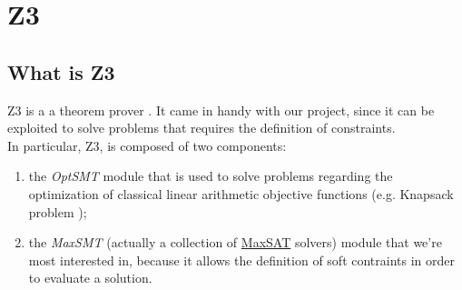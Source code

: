 \chapter{Z3}\label{Z3}
\section{What is Z3}
Z3 is a a theorem prover \cite{z3}. It came in handy with our project, since it can be exploited to solve problems that requires the definition of constraints.\\
In particular, Z3, is composed of two components:
\begin{enumerate}
  \item the \textit{OptSMT} module that is used to solve problems regarding the optimization of classical linear arithmetic objective functions (e.g. Knapsack problem \cite{knapsack});
  \item the \textit{MaxSMT} (actually a collection of \underline{MaxSAT} solvers) module that we're most interested in, because it allows the definition of soft contraints in order to evaluate a solution.
\end{enumerate}


